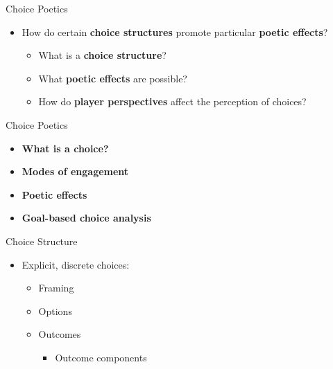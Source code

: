 \documentclass[xcolor=x11names]{beamer}
\begin{document}
\begin{frame}{Choice Poetics}
  \vfill
  \begin{itemize}\addtolength{\itemsep}{0.5\baselineskip}
      \item How do certain \textbf{choice structures} promote particular \textbf{poetic effects}?
    \begin{itemize}\addtolength{\itemsep}{0.5\baselineskip}
      \vspace{0.5\baselineskip}
      \item What is a \textbf{choice structure}?
      \item What \textbf{poetic effects} are possible?
      \item How do \textbf{player perspectives} affect the perception of choices?
    \end{itemize}
  \end{itemize}
  \vfill
  \centering
  \tiny
\end{frame}

\begin{frame}{Choice Poetics}
  \begin{itemize}\addtolength{\itemsep}{0.5\baselineskip}
      \item \textbf{What is a choice?}
      \item \textbf{Modes of engagement}
      \item \textbf{Poetic effects}
      \item \textbf{Goal-based choice analysis}
  \end{itemize}
\end{frame}

\begin{frame}{Choice Structure}
  \begin{itemize}\addtolength{\itemsep}{0.5\baselineskip}
    \item Explicit, discrete choices:
    \begin{itemize}\addtolength{\itemsep}{0.5\baselineskip}
      \vspace{0.5\baselineskip}
      \item Framing
      \item Options
      \item Outcomes
      \begin{itemize}\addtolength{\itemsep}{0.5\baselineskip}
        \vspace{0.5\baselineskip}
        \item Outcome components
      \end{itemize}
    \end{itemize}
  \end{itemize}
\end{frame}
\end{document}
